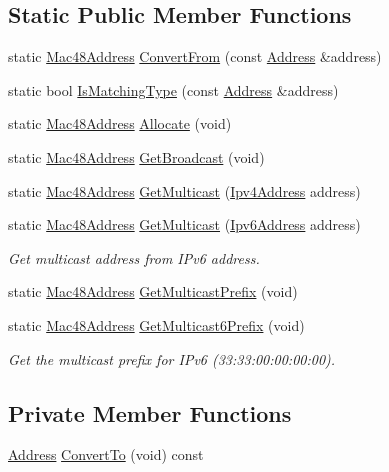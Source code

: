 \subsection*{Static Public Member Functions}
\begin{DoxyCompactItemize}
\item 
static \hyperlink{classns3_1_1Mac48Address}{Mac48\+Address} \hyperlink{classns3_1_1Mac48Address_a911ce13603a9ef837545a032b6523ae4}{Convert\+From} (const \hyperlink{classns3_1_1Address}{Address} \&address)
\item 
static bool \hyperlink{classns3_1_1Mac48Address_a55cc1e3c6aa63fd1a4f8f7d9be4ae182}{Is\+Matching\+Type} (const \hyperlink{classns3_1_1Address}{Address} \&address)
\item 
static \hyperlink{classns3_1_1Mac48Address}{Mac48\+Address} \hyperlink{classns3_1_1Mac48Address_a203b53c035649c0d4881fa1115aa2cdb}{Allocate} (void)
\item 
static \hyperlink{classns3_1_1Mac48Address}{Mac48\+Address} \hyperlink{classns3_1_1Mac48Address_a55156e302c6bf950c0b558365adbde84}{Get\+Broadcast} (void)
\item 
static \hyperlink{classns3_1_1Mac48Address}{Mac48\+Address} \hyperlink{classns3_1_1Mac48Address_a23d170f8c7a7d90a8110425620285819}{Get\+Multicast} (\hyperlink{classns3_1_1Ipv4Address}{Ipv4\+Address} address)
\item 
static \hyperlink{classns3_1_1Mac48Address}{Mac48\+Address} \hyperlink{classns3_1_1Mac48Address_a5cac17160dc5bcbdf5a35a5ed5ec047a}{Get\+Multicast} (\hyperlink{classns3_1_1Ipv6Address}{Ipv6\+Address} address)
\begin{DoxyCompactList}\small\item\em Get multicast address from I\+Pv6 address. \end{DoxyCompactList}\item 
static \hyperlink{classns3_1_1Mac48Address}{Mac48\+Address} \hyperlink{classns3_1_1Mac48Address_a972212d7b69ef0beab1048c733619b3a}{Get\+Multicast\+Prefix} (void)
\item 
static \hyperlink{classns3_1_1Mac48Address}{Mac48\+Address} \hyperlink{classns3_1_1Mac48Address_a7bcab40f43eac96f68dc7160302c0a08}{Get\+Multicast6\+Prefix} (void)
\begin{DoxyCompactList}\small\item\em Get the multicast prefix for I\+Pv6 (33\+:33\+:00\+:00\+:00\+:00). \end{DoxyCompactList}\end{DoxyCompactItemize}
\subsection*{Private Member Functions}
\begin{DoxyCompactItemize}
\item 
\hyperlink{classns3_1_1Address}{Address} \hyperlink{classns3_1_1Mac48Address_a2b04b1b8202f08e48710e98ed312cd27}{Convert\+To} (void) const 
\end{DoxyCompactItemize}
